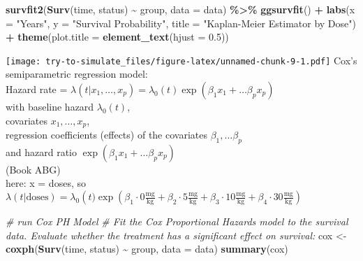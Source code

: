 \documentclass[
]{article}
\newenvironment{Shaded}{\begin{snugshade}}{\end{snugshade}}
\newcommand{\AttributeTok}[1]{\textcolor[rgb]{0.13,0.29,0.53}{#1}}
\newcommand{\CommentTok}[1]{\textcolor[rgb]{0.56,0.35,0.01}{\textit{#1}}}
\newcommand{\FloatTok}[1]{\textcolor[rgb]{0.00,0.00,0.81}{#1}}
\newcommand{\FunctionTok}[1]{\textcolor[rgb]{0.13,0.29,0.53}{\textbf{#1}}}
\newcommand{\NormalTok}[1]{#1}
\newcommand{\OtherTok}[1]{\textcolor[rgb]{0.56,0.35,0.01}{#1}}
\newcommand{\SpecialCharTok}[1]{\textcolor[rgb]{0.81,0.36,0.00}{\textbf{#1}}}
\newcommand{\StringTok}[1]{\textcolor[rgb]{0.31,0.60,0.02}{#1}}
\begin{document}
\begin{Shaded}
\begin{Highlighting}[]
\FunctionTok{survfit2}\NormalTok{(}\FunctionTok{Surv}\NormalTok{(time, status) }\SpecialCharTok{\textasciitilde{}}\NormalTok{ group, }\AttributeTok{data =}\NormalTok{ data) }\SpecialCharTok{\%\textgreater{}\%}
  \FunctionTok{ggsurvfit}\NormalTok{() }\SpecialCharTok{+}
  \FunctionTok{labs}\NormalTok{(}\AttributeTok{x =} \StringTok{"Years"}\NormalTok{,}
       \AttributeTok{y =} \StringTok{"Survival Probability"}\NormalTok{,}
       \AttributeTok{title =} \StringTok{"Kaplan{-}Meier Estimator by Dose"}\NormalTok{) }\SpecialCharTok{+}
  \FunctionTok{theme}\NormalTok{(}\AttributeTok{plot.title =} \FunctionTok{element\_text}\NormalTok{(}\AttributeTok{hjust =} \FloatTok{0.5}\NormalTok{))}
\end{Highlighting}
\end{Shaded}

\texttt{[image: try-to-simulate\_files/figure-latex/unnamed-chunk-9-1.pdf]}
Cox's semiparametric regression model:\\
Hazard rate =
\(\lambda \left(t|x_1,\ldots, x_p\right) = \lambda_0\left(t\right)\exp\left(\beta_1x_1+ \ldots \beta_px_p\right)\)\\
with baseline hazard \(\lambda_0\left(t\right)\),\\
covariates \(x_1,\ldots, x_p\),\\
regression coefficients (effects) of the covariates
\(\beta_1,\ldots\beta_p\)\\
and hazard ratio \(\exp\left(\beta_1x_1+ \ldots \beta_px_p\right)\)\\
(Book ABG)\\
here: x = doses, so\\
\(\lambda \left(t|\text{doses}\right) = \lambda_0\left(t)\exp\left(\beta_1 \cdot 0 \frac{\text{mg}}{\text{kg}} + \beta_2 \cdot 5 \frac{\text{mg}}{\text{kg}} + \beta_3 \cdot 10 \frac{\text{mg}}{\text{kg}} + \beta_4 \cdot 30 \frac{\text{mg}}{\text{kg}}\right)\)\\

\begin{Shaded}
\begin{Highlighting}[]
\CommentTok{\# run Cox PH Model}
\CommentTok{\# Fit the Cox Proportional Hazards model to the survival data. Evaluate whether the treatment has a significant effect on survival:}
\NormalTok{cox }\OtherTok{\textless{}{-}} \FunctionTok{coxph}\NormalTok{(}\FunctionTok{Surv}\NormalTok{(time, status) }\SpecialCharTok{\textasciitilde{}}\NormalTok{ group, }\AttributeTok{data =}\NormalTok{ data)}
\FunctionTok{summary}\NormalTok{(cox)}
\end{Highlighting}
\end{Shaded}
\end{document}
